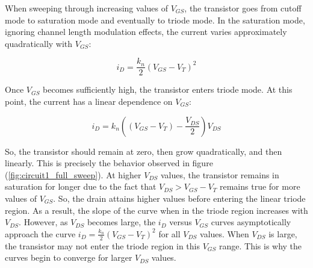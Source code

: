 \FloatBarrier

When sweeping through increasing values of $V_{GS}$, the transistor goes from cutoff mode to saturation mode and eventually to triode mode. In the saturation mode, ignoring channel length modulation effects, the current varies approximately quadratically with $V_{GS}$:

\begin{equation}
	\label{eq:sat_current}
	i_D = \frac{k_n}{2} ( V_{GS} - V_{T} )^2
\end{equation}

Once $V_{GS}$ becomes sufficiently high, the transistor enters triode mode. At this point, the current has a linear dependence on $V_{GS}$:

\begin{equation}
	\label{eq:triode_current}
	i_D = k_n ( ( V_{GS} - V_{T} ) - \frac{V_{DS}}{2} ) V_{DS}
\end{equation}

So, the transistor should remain at zero, then grow quadratically, and then linearly. This is precisely the behavior observed in figure (\ref{fig:circuit1_full_sweep}). At higher $V_{DS}$ values, the transistor remains in saturation for longer due to the fact that $V_{DS} > V_{GS} - V_{T}$ remains true for more values of $V_{GS}$. So, the drain attains higher values before entering the linear triode region. As a result, the slope of the curve when in the triode region increases with $V_{DS}$. However, as $V_{DS}$ becomes large, the $i_D$ versus $V_{GS}$ curves asymptotically approach the curve $i_D = \frac{k_n}{2} ( V_{GS} - V_{T} )^2$ for all $V_{DS}$ values. When $V_{DS}$ is large, the transistor may not enter the triode region in this $V_{GS}$ range. This is why the curves begin to converge for larger $V_{DS}$ values. 
